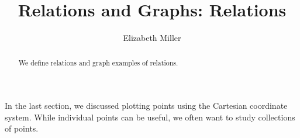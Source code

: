 \documentclass[nooutcomes]{ximera}
\author{Elizabeth Miller}
\title{Relations and Graphs: Relations}
\begin{document}
\begin{abstract}
We define relations and graph examples of relations. 
\end{abstract}
\maketitle


In the last section, we discussed plotting points using the Cartesian coordinate system. While individual points can be useful, we often want to study collections of points.
\end{document}
